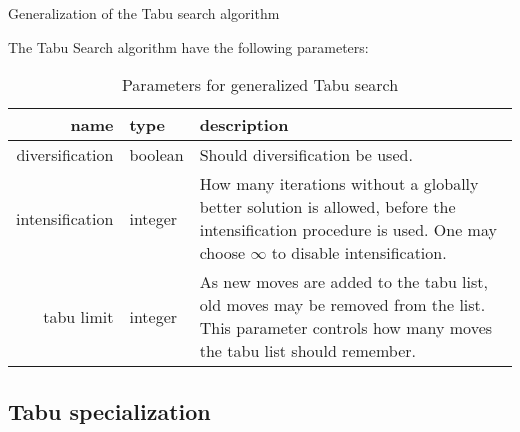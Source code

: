 \begin{algorithm}[H]
  \caption{Generalization of the Tabu search algorithm}
  \begin{algorithmic}[1]
     
     
     
    \State
    \Repeat
         
            \State {}
        \Else
                 
            \EndIf
             
        \EndIf
        
        \EndIf
    \State {}
    \EndFunction
  \end{algorithmic}
\end{algorithm}

The Tabu Search algorithm have the following parameters:

\begin{table}[H]
\centering
\begin{tabular}{r|p{2cm}|p{6cm}}
	name & type & description \\ \hline
	diversification & boolean & Should diversification be used. \\
	intensification & integer & How many iterations without a globally better solution is allowed, before the intensification procedure is used. One may choose $\infty$ to disable intensification. \\
	tabu limit & integer & As new moves are added to the tabu list, old moves may be removed from the list. This parameter controls how many moves the tabu list should remember.
\end{tabular}
\caption{Parameters for generalized Tabu search}
\end{table}

\subsection{Tabu specialization}

